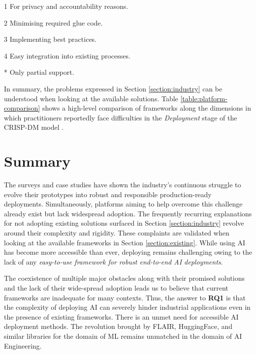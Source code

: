 \begin{table}
\begin{threeparttable}
\begin{tablenotes}
\item[1] For privacy and accountability reasons. \cite{bosch2021engineering}
\item[2] Minimising required glue code. \cite{sculley2015hidden}
\item[3] Implementing best practices. \cite{serban2020adoption,serban2021practices,john2020architecting}
\item[4] Easy integration into existing processes. \cite{haakman2021ai,thiee2021systematic}
\item[*] Only partial support.
\end{tablenotes}
\end{threeparttable}
\end{table}

In summary, the problems expressed in Section \ref{section:industry} can be understood when looking at the available solutions. Table \ref{table:platform-comparison} shows a high-level comparison of frameworks along the dimensions in which practitioners reportedly face difficulties in the \textit{Deployment} stage of the CRISP-DM model \cite{wirth2000crisp}.

\section{Summary}

The surveys and case studies have shown the industry's continuous struggle to evolve their prototypes into robust and responsible production-ready deployments. Simultaneously, platforms aiming to help overcome this challenge already exist but lack widespread adoption. The frequently recurring explanations for not adopting existing solutions surfaced in Section \ref{section:industry} revolve around their complexity and rigidity. These complaints are validated when looking at the available frameworks in Section \ref{section:existing}. While using AI has become more accessible than ever, deploying remains challenging owing to the lack of any \textit{easy-to-use framework for robust end-to-end AI deployments}.

The coexistence of multiple major obstacles along with their promised solutions and the lack of their wide-spread adoption leads us to believe that current frameworks are inadequate for many contexts. Thus, the answer to \textbf{RQ1} is that the complexity of deploying AI can severely hinder industrial applications even in the presence of existing frameworks. There is an unmet need for accessible AI deployment methods. The revolution brought by FLAIR, HuggingFace, and similar libraries for the domain of ML remains unmatched in the domain of AI Engineering.
